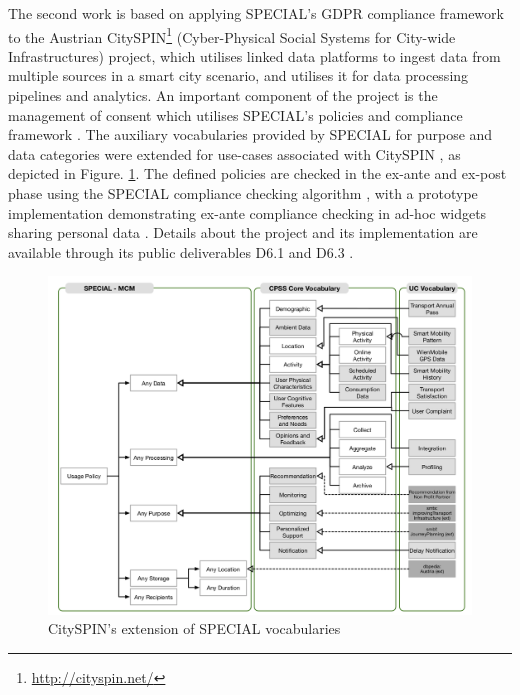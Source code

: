 The second work is based on applying SPECIAL's GDPR compliance framework to the Austrian CitySPIN\footnote{\url{http://cityspin.net/}} (Cyber-Physical Social Systems for City-wide Infrastructures) project, which utilises linked data platforms to ingest data from multiple sources in a smart city scenario, and utilises it for data processing pipelines and analytics. An important component of the project is the management of consent which utilises SPECIAL's policies \cite{bonatti_special_2018-1,bonatti_special_2018-2} and compliance framework \cite{kirrane_scalable_2018}.
The auxiliary vocabularies provided by SPECIAL for purpose and data categories were extended for use-cases associated with CitySPIN \cite{fernandez_user_2019}, as depicted in Figure. \ref{fig:SPECIAL-CitySPIN}. 
The defined policies are checked in the ex-ante and ex-post phase using the SPECIAL compliance checking algorithm \cite{bonatti_fast_2018,bonatti_richer_2019}, with a prototype implementation demonstrating ex-ante compliance checking in ad-hoc widgets sharing personal data \cite{fernandez_privacy-aware_2019}. Details about the project and its implementation are available through its public deliverables D6.1 \cite{noauthor_d6.1_nodate} and D6.3 \cite{noauthor_d6.3_nodate}.

\begin{figure}[h]
    \centering
    \includegraphics[width=\linewidth]{img/SPECIAL_CitySPIN.png}
    \caption{CitySPIN's extension of SPECIAL vocabularies \cite{fernandez_user_2019}}
    \label{fig:SPECIAL-CitySPIN}
\end{figure}

